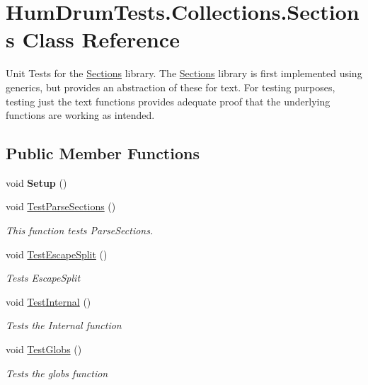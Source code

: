 \hypertarget{classHumDrumTests_1_1Collections_1_1Sections}{}\section{Hum\+Drum\+Tests.\+Collections.\+Sections Class Reference}
\label{classHumDrumTests_1_1Collections_1_1Sections}


Unit Tests for the \hyperlink{classHumDrumTests_1_1Collections_1_1Sections}{Sections} library. The \hyperlink{classHumDrumTests_1_1Collections_1_1Sections}{Sections} library is first implemented using generics, but provides an abstraction of these for text. For testing purposes, testing just the text functions provides adequate proof that the underlying functions are working as intended.  


\subsection*{Public Member Functions}
\begin{DoxyCompactItemize}
\item 
\hypertarget{classHumDrumTests_1_1Collections_1_1Sections_afac2da0762d02ff32dc3e97d479d995f}{}void {\bfseries Setup} ()\label{classHumDrumTests_1_1Collections_1_1Sections_afac2da0762d02ff32dc3e97d479d995f}

\item 
void \hyperlink{classHumDrumTests_1_1Collections_1_1Sections_a0b572152156a1729cd41bc1e974f9af6}{Test\+Parse\+Sections} ()
\begin{DoxyCompactList}\small\item\em This function tests Parse\+Sections. \end{DoxyCompactList}\item 
void \hyperlink{classHumDrumTests_1_1Collections_1_1Sections_a5b6c58c513742ea5edbb4b64e1a4a92b}{Test\+Escape\+Split} ()
\begin{DoxyCompactList}\small\item\em Tests Escape\+Split \end{DoxyCompactList}\item 
void \hyperlink{classHumDrumTests_1_1Collections_1_1Sections_a4bb5d3ebc8a990cce9d1e9b34e7d65a0}{Test\+Internal} ()
\begin{DoxyCompactList}\small\item\em Tests the Internal function \end{DoxyCompactList}\item 
void \hyperlink{classHumDrumTests_1_1Collections_1_1Sections_a07bf3890ae5c723ca7cf9b73ce5eb1a7}{Test\+Globs} ()
\begin{DoxyCompactList}\small\item\em Tests the globs function \end{DoxyCompactList}\end{DoxyCompactItemize}


